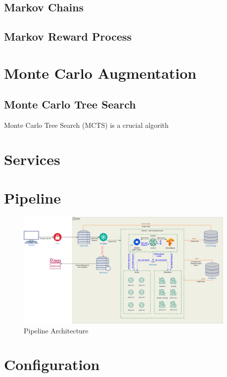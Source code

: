 \subsection{Markov Chains}
\subsection{Markov Reward Process}
\section{Monte Carlo Augmentation}
\subsection{Monte Carlo Tree Search}
Monte Carlo Tree Search (MCTS) is a crucial algorith \cite{MCTS}
\section{Services}
\section{Pipeline}
\begin{figure}
	\centering
	\includegraphics[width=0.95\textwidth]{Figures/AlphaZero.png}
	\caption{Pipeline Architecture}
\end{figure}
\section{Configuration}
